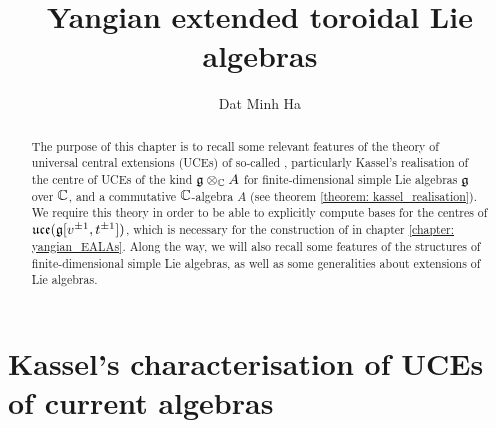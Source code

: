 

\setcounter{chapter}{-1}
\setcounter{section}{-1}


\newcommand{\toroidal}{\t}
\newcommand{\extendedtoroidal}{\hat{\t}}
\newcommand{\simpleroots}{\mathbb{I}}
\renewcommand{\positive}{+} 
\renewcommand{\negative}{-}
\newcommand{\divzero}{\der_{\gamma}(A)}



    \title{Yangian extended toroidal Lie algebras}
    
    \author{Dat Minh Ha}
    \maketitle
    
    {
      \hypersetup{} 
      \dominitoc
      \tableofcontents %
    }

    \newpage

    \listoftodos

    \newpage

    

    \newpage
    
    \chapter{Kassel's characterisation of UCEs of current algebras}
        \begin{abstract}
            The purpose of this chapter is to recall some relevant features of the theory of universal central extensions (UCEs) of so-called , particularly Kassel's realisation of the centre of UCEs of the kind $\g \tensor_{\bbC} A$ for finite-dimensional simple Lie algebras $\mathfrak{g}$ over $\mathbb{C}$, and a commutative $\mathbb{C}$-algebra $A$ (see theorem \ref{theorem: kassel_realisation}). We require this theory in order to be able to explicitly compute bases for the centres of $\mathfrak{uce}(\mathfrak{g}[v^{\pm 1}, t^{\pm 1}])$, which is necessary for the construction of  in chapter \ref{chapter: yangian_EALAs}. Along the way, we will also recall some features of the structures of finite-dimensional simple Lie algebras, as well as some generalities about extensions of Lie algebras.
        \end{abstract}

        \minitoc
    
       

